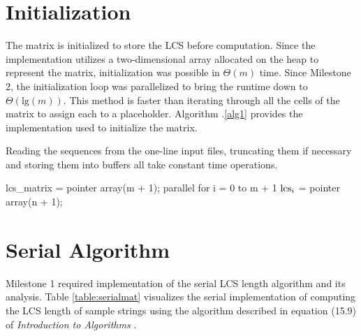 \documentclass[usletter, 11pt]{extarticle}
\newcommand{\V}[1]{\textup{#1}}
\newcommand{\lcs}{\V{lcs}}
\begin{document}
    \section{Initialization} The matrix is initialized to store the LCS before
    computation. Since the implementation utilizes a two-dimensional array
    allocated on the heap to represent the matrix, initialization was possible
    in $\Theta(m)$ time. Since Milestone 2, the initialization loop was
    parallelized to bring the runtime down to $\Theta(\text{lg}(m))$. This
    method is faster than iterating through all the cells of the matrix to
    assign each to a placeholder. Algorithm \thesection .\ref{alg1} provides
    the implementation used to initialize the matrix.

    Reading the sequences from the one-line input files, truncating them if
    necessary and storing them into buffers all take constant time operations.
    \newpage

\begin{pseudocode}[caption={Initialization of the Longest Common Subsequence
Matrix}, label={alg1}]
lcs_matrix = pointer array(m + 1);
parallel for i = 0 to m + 1
    $\lcs_{i}$ = pointer array(n + 1);

\end{pseudocode}

    \section{Serial Algorithm} Milestone 1 required implementation of the
    serial LCS length algorithm and its analysis. Table \ref{table:serialmat}
    visualizes the serial implementation of computing the LCS length of sample
    strings using the algorithm described in equation (15.9) of
    \textit{Introduction to Algorithms} \cite{Cormen:2009:IAT:1614191}.
\end{document}

